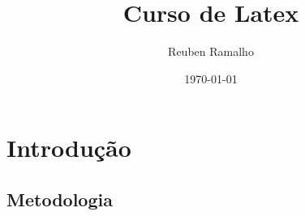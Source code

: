 \documentclass{article}
\title{Curso de Latex}
\author{Reuben Ramalho}
\date{\today}
\begin{document}
\maketitle


\section{Introdução}

\subsection{Metodologia}
\end{document}
